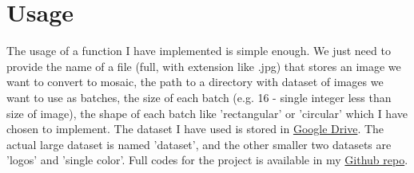 \documentclass{IEEEtran}
\begin{document}
\section{Usage}
The usage of a function I have implemented is simple enough. We just need to provide the name of a file (full, with extension like .jpg) that stores an image we want to convert to mosaic, the path to a directory with dataset of images we want to use as batches, the size of each batch (e.g. 16 - single integer less than size of image), the shape of each batch like 'rectangular' or 'circular' which I have chosen to implement. The dataset I have used is stored in \href{https://drive.google.com/drive/folders/1KTq2VM1byxpjf9OiO63ZdDivGOGZdsAc?usp=sharing}{Google Drive}. The actual large dataset is named 'dataset', and the other smaller two datasets are 'logos' and 'single color'. Full codes for the project is available in my \href{https://github.com/ardulat/image-processing/tree/master/assignment_1}{Github repo}.
\end{document}
